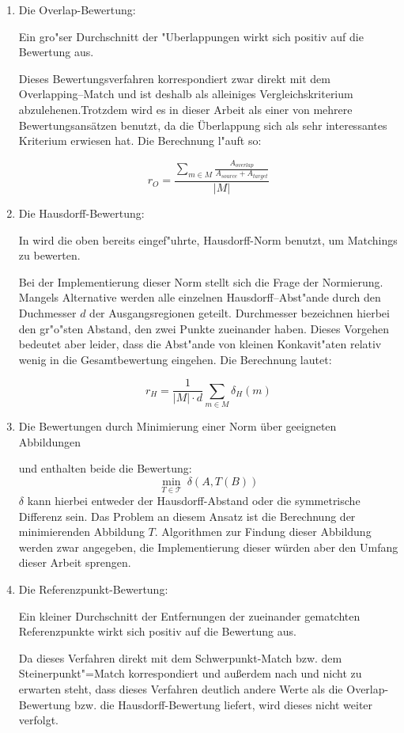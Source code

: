 \begin{enumerate}
\item Die Overlap-Bewertung: 

Ein gro"ser Durchschnitt der "Uberlappungen wirkt sich positiv auf die Bewertung aus.

Dieses Bewertungsverfahren korrespondiert zwar direkt mit dem Overlapping--Match und ist deshalb als alleiniges Vergleichskriterium abzulehenen.Trotzdem wird es in dieser Arbeit als einer von mehrere Bewertungsansätzen benutzt, da die Überlappung sich als sehr interessantes Kriterium erwiesen hat. Die Berechnung l"auft so:

$$r_O=\frac{\sum_{m\in M} \frac{A_{overlap}}{A_{source}+A_{target}}}{|M|}$$

\item Die Hausdorff-Bewertung:

In \cite{AAR} wird die oben bereits eingef"uhrte, Hausdorff-Norm benutzt, um Matchings zu bewerten. 

Bei der Implementierung dieser Norm stellt sich die Frage der Normierung. Mangels Alternative werden alle einzelnen Hausdorff--Abst"ande durch den Duchmesser $d$ der Ausgangsregionen geteilt.  Durchmesser bezeichnen hierbei den gr"o"sten Abstand, den zwei Punkte zueinander haben. Dieses Vorgehen bedeutet aber leider, dass die Abst"ande von kleinen Konkavit"aten relativ wenig in die Gesamtbewertung eingehen. Die Berechnung lautet:

$$r_H=\frac{1}{|M| \cdot d}\sum_{m\in M}\delta_H(m)$$

\item Die Bewertungen durch Minimierung einer Norm über geeigneten Abbildungen

\cite{AAR} und \cite{AFRW} enthalten beide die Bewertung:
$$\min_{T\in\mathcal{T}}\: \delta(A,T(B))$$
$\delta$ kann hierbei entweder der Hausdorff-Abstand oder die symmetrische Differenz sein. Das Problem an diesem Ansatz ist die Berechnung der minimierenden Abbildung $T$. Algorithmen zur Findung dieser Abbildung werden zwar angegeben, die Implementierung dieser würden aber den Umfang dieser Arbeit sprengen.

\item Die Referenzpunkt-Bewertung:

Ein kleiner Durchschnitt der Entfernungen der zueinander gematchten Referenzpunkte wirkt sich positiv auf die Bewertung aus.

Da dieses Verfahren direkt mit dem Schwerpunkt-Match bzw. dem Steinerpunkt"=Match korrespondiert und außerdem nach \cite{AFRW} und \cite{AAR} nicht zu erwarten steht, dass dieses Verfahren deutlich andere Werte als die Overlap-Bewertung bzw. die Hausdorff-Bewertung liefert, wird dieses nicht weiter verfolgt.


\end{enumerate}
